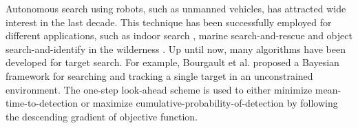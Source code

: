 \documentclass[twocolumn,10pt]{asme2e}
\newcommand{\todonote}[1]{\vspace{0px} %
\todo[inline, color=green!30]{\textbf{[Note:]} {#1}} %
}
\begin{document}

Autonomous search using robots, such as unmanned vehicles, has attracted wide interest in the last decade.
This technique has been successfully employed for different applications, such as indoor search \cite{lau2006probabilistic}, marine search-and-rescue \cite{furukawa2006recursive} and object search-and-identify in the wilderness \cite{chung2009probabilistic}.
Up until now, many algorithms have been developed for target search.
For example, Bourgault et al. \cite{bourgault2006optimal} proposed a Bayesian framework for searching and tracking a single target in an unconstrained environment.
The one-step look-ahead scheme is used to either minimize mean-time-to-detection or maximize cumulative-probability-of-detection by following the descending gradient of objective function.
\end{document}
